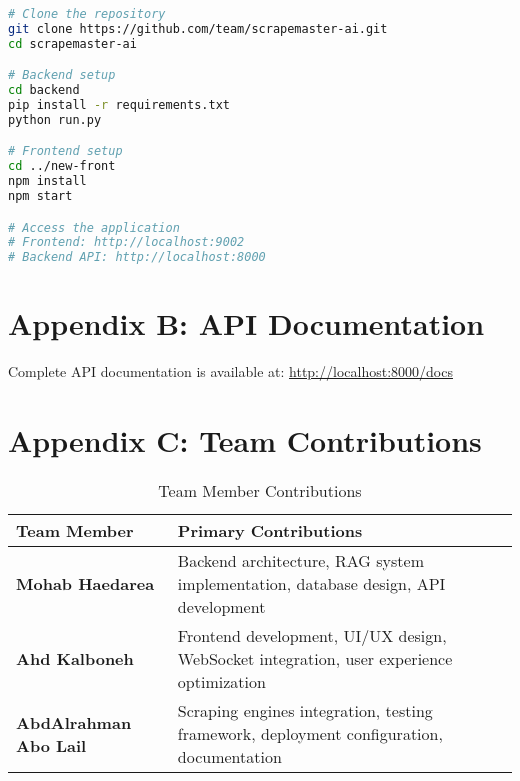 \documentclass[12pt,a4paper]{report}
\begin{document}
\begin{lstlisting}[language=bash, caption=Installation Commands]
# Clone the repository
git clone https://github.com/team/scrapemaster-ai.git
cd scrapemaster-ai

# Backend setup
cd backend
pip install -r requirements.txt
python run.py

# Frontend setup
cd ../new-front
npm install
npm start

# Access the application
# Frontend: http://localhost:9002
# Backend API: http://localhost:8000
\end{lstlisting}

\section*{Appendix B: API Documentation}

Complete API documentation is available at: \url{http://localhost:8000/docs}

\section*{Appendix C: Team Contributions}

\begin{table}[H]
    \centering
    \caption{Team Member Contributions}
    \begin{tabular}{|l|p{8cm}|}
        \hline
        \rowcolor{primaryblue!20}
        \textbf{Team Member} & \textbf{Primary Contributions} \\
        \hline
        \textbf{Mohab Haedarea} & Backend architecture, RAG system implementation, database design, API development \\
        \hline
        \textbf{Ahd Kalboneh} & Frontend development, UI/UX design, WebSocket integration, user experience optimization \\
        \hline
        \textbf{AbdAlrahman Abo Lail} & Scraping engines integration, testing framework, deployment configuration, documentation \\
        \hline
    \end{tabular}
\end{table}
\end{document}
